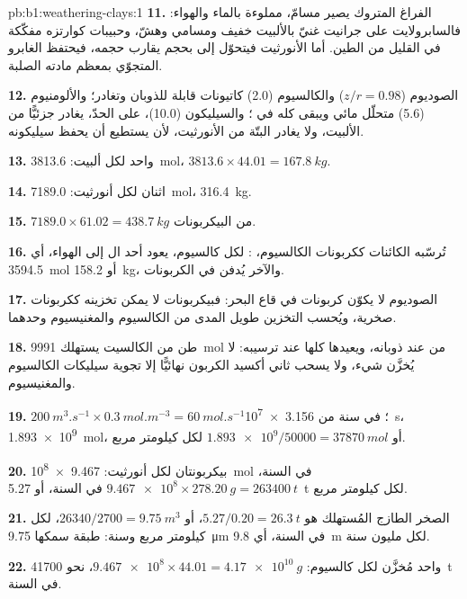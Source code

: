\begin{solution}{pb:b1:weathering-clays:1}
\textbf{11.} الفراغ المتروك يصير مسامّ، مملوءة بالماء والهواء: فالسابرولايت على جرانيت غنيّ بالألبيت خفيف ومسامي وهشّ، وحبيبات كوارتزه مفكّكة في القليل من الطين. أما الأنورثيت فيتحوّل إلى  بحجم يقارب حجمه، فيحتفظ الغابرو المتجوّي بمعظم مادته الصلبة.

\textbf{12.} الصوديوم ($z/r = 0.98$) والكالسيوم (2.0) كاتيونات قابلة للذوبان وتغادر؛ والألومنيوم (5.6) متحلّل مائي ويبقى كله في ؛ والسيليكون (10.0)، على الحدّ، يغادر جزئيًّا من الألبيت، ولا يغادر البتّة من الأنورثيت، لأن  يستطيع أن يحفظ سيليكونه.

\textbf{13.}  واحد لكل ألبيت: \qty{3813.6}{mol}، $3813.6 \times 44.01 =
\qty{167.8}{kg}$.

\textbf{14.} اثنان لكل أنورثيت: \qty{7189.0}{mol}، \qty{316.4}{kg}.

\textbf{15.} $7189.0 \times 61.02 = \qty{438.7}{kg}$ من البيكربونات.

\textbf{16.} تُرسّبه الكائنات ككربونات الكالسيوم،
: لكل كالسيوم، يعود أحد ال إلى الهواء، أي \qty{3594.5}{mol} أو \qty{158.2}{kg}، والآخر يُدفن في الكربونات.

\textbf{17.} الصوديوم لا يكوّن كربونات في قاع البحر: فبيكربونات لا يمكن تخزينه ككربونات صخرية، ويُحسب التخزين طويل المدى من الكالسيوم والمغنيسيوم وحدهما.

\textbf{18.} طن من الكالسيت يستهلك \qty{9991}{mol} من  عند ذوبانه، ويعيدها كلها عند ترسيبه: لا يُخزَّن شيء، ولا يسحب ثاني أكسيد الكربون نهائيًّا إلا تجوية سيليكات الكالسيوم والمغنيسيوم.

\textbf{19.} $\qty{200}{m^3.s^{-1}} \times \qty{0.3}{mol.m^{-3}} =
\qty{60}{mol.s^{-1}}$؛ في سنة من \qty{3.156e7}{s}، \qty{1.893e9}{mol}، أو
$\num{1.893e9}/\num{50000} = \qty{37870}{mol}$ لكل كيلومتر مربع.

\textbf{20.} بيكربونتان لكل أنورثيت: \qty{9.467e8}{mol} في السنة،
$\num{9.467e8}\times\qty{278.20}{g} = \qty{263400}{t}$ في السنة، أو
\qty{5.27}{t} لكل كيلومتر مربع.

\textbf{21.} الصخر الطازج المُستهلك هو $5.27/0.20 = \qty{26.3}{t}$، أو
$\num{26340}/2700 = \qty{9.75}{m^3}$، لكل كيلومتر مربع وسنة: طبقة سمكها
\qty{9.75}{\micro m} في السنة، أي \qty{9.8}{m} لكل مليون سنة.

\textbf{22.}  واحد مُخزَّن لكل كالسيوم: $\num{9.467e8} \times 44.01 =
\qty{4.17e10}{g}$، نحو \qty{41700}{t} في السنة.


\end{solution}
